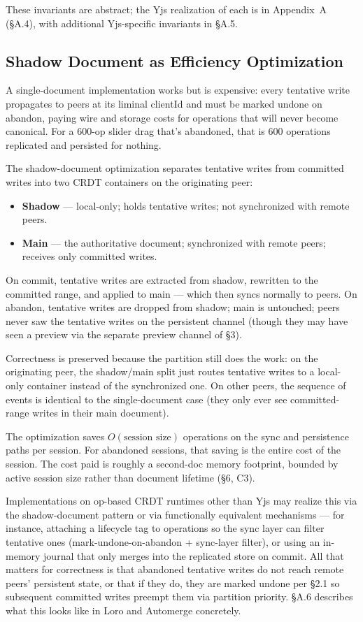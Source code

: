 These invariants are abstract; the Yjs realization of each is in Appendix~A (\S A.4), with additional Yjs-specific invariants in \S A.5.

\subsection{Shadow Document as Efficiency Optimization}

A single-document implementation works but is expensive: every tentative write propagates to peers at its liminal clientId and must be marked undone on abandon, paying wire and storage costs for operations that will never become canonical. For a 600-op slider drag that's abandoned, that is 600 operations replicated and persisted for nothing.

The shadow-document optimization separates tentative writes from committed writes into two CRDT containers on the originating peer:

\begin{itemize}
    \item \textbf{Shadow} --- local-only; holds tentative writes; not synchronized with remote peers.
    \item \textbf{Main} --- the authoritative document; synchronized with remote peers; receives only committed writes.
\end{itemize}

On commit, tentative writes are extracted from shadow, rewritten to the committed range, and applied to main --- which then syncs normally to peers. On abandon, tentative writes are dropped from shadow; main is untouched; peers never saw the tentative writes on the persistent channel (though they may have seen a preview via the separate preview channel of \S3).

Correctness is preserved because the partition still does the work: on the originating peer, the shadow/main split just routes tentative writes to a local-only container instead of the synchronized one. On other peers, the sequence of events is identical to the single-document case (they only ever see committed-range writes in their main document).

The optimization saves $O(\text{session size})$ operations on the sync and persistence paths per session. For abandoned sessions, that saving is the entire cost of the session. The cost paid is roughly a second-doc memory footprint, bounded by active session size rather than document lifetime (\S6, C3).

Implementations on op-based CRDT runtimes other than Yjs may realize this via the shadow-document pattern or via functionally equivalent mechanisms --- for instance, attaching a lifecycle tag to operations so the sync layer can filter tentative ones (mark-undone-on-abandon + sync-layer filter), or using an in-memory journal that only merges into the replicated store on commit. All that matters for correctness is that abandoned tentative writes do not reach remote peers' persistent state, or that if they do, they are marked undone per \S2.1 so subsequent committed writes preempt them via partition priority. \S A.6 describes what this looks like in Loro and Automerge concretely.


